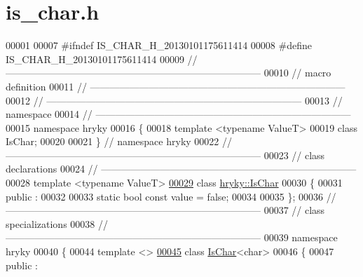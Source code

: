 \hypertarget{is__char_8h_source}{\section{is\-\_\-char.\-h}
}

\begin{DoxyCode}
00001 
00007 \textcolor{preprocessor}{#ifndef IS\_CHAR\_H\_20130101175611414}
00008 \textcolor{preprocessor}{}\textcolor{preprocessor}{#define IS\_CHAR\_H\_20130101175611414}
00009 \textcolor{preprocessor}{}\textcolor{comment}{//
      ------------------------------------------------------------------------------}
00010 \textcolor{comment}{// macro definition}
00011 \textcolor{comment}{//
      ------------------------------------------------------------------------------}
00012 \textcolor{comment}{//
      ------------------------------------------------------------------------------}
00013 \textcolor{comment}{// namespace}
00014 \textcolor{comment}{//
      ------------------------------------------------------------------------------}
00015 \textcolor{keyword}{namespace }hryky
00016 \{
00018     \textcolor{keyword}{template} <\textcolor{keyword}{typename} ValueT>
00019     \textcolor{keyword}{class }IsChar;
00020 
00021 \} \textcolor{comment}{// namespace hryky}
00022 \textcolor{comment}{//
      ------------------------------------------------------------------------------}
00023 \textcolor{comment}{// class declarations}
00024 \textcolor{comment}{//
      ------------------------------------------------------------------------------}
00028 \textcolor{comment}{}\textcolor{keyword}{template} <\textcolor{keyword}{typename} ValueT>
\hypertarget{is__char_8h_source_l00029}{}\hyperlink{classhryky_1_1_is_char}{00029} \textcolor{keyword}{class }\hyperlink{classhryky_1_1_is_char}{hryky::IsChar}
00030 \{
00031 \textcolor{keyword}{public} :
00032 
00033     \textcolor{keyword}{static} \textcolor{keywordtype}{bool} \textcolor{keyword}{const} value = \textcolor{keyword}{false};
00034 
00035 \};
00036 \textcolor{comment}{//
      ------------------------------------------------------------------------------}
00037 \textcolor{comment}{// class specializations}
00038 \textcolor{comment}{//
      ------------------------------------------------------------------------------}
00039 \textcolor{keyword}{namespace }hryky
00040 \{
00044 \textcolor{keyword}{template} <>
\hypertarget{is__char_8h_source_l00045}{}\hyperlink{classhryky_1_1_is_char_3_01char_01_4}{00045} \textcolor{keyword}{class }\hyperlink{classhryky_1_1_is_char}{IsChar}<char>
00046 \{
00047 \textcolor{keyword}{public} :

\end{DoxyCode}
